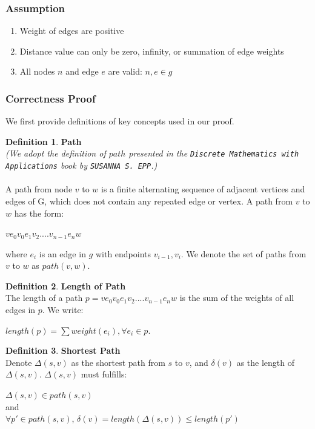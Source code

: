 \documentclass[11pt, a4paper]{article} %
\theoremstyle{definition}
\newtheorem{definition}{Definition}[section]
\begin{document}
\subsubsection{Assumption}
\begin{enumerate}
  \item Weight of edges are positive
  \item Distance value can only be zero, infinity, or summation of edge weights
  \item All nodes $n$ and edge $e$ are valid: $n, e \in g$
\end{enumerate}

\subsubsection{Correctness Proof}
We first provide definitions of key concepts used in our proof.
\theoremstyle{definition}
\begin{definition}\textbf{Path}\\
\textit{(We adopt the definition of $path$ presented in the \texttt{Discrete Mathematics with Applications} book by \texttt{SUSANNA S. EPP}.)}
\\\\
A path from node $v$ to $w$ is a finite alternating sequence of adjacent vertices and edges of G, which does not contain any repeated edge or vertex. A path from $v$ to $w$ has the form: 
\begin{center}
 $ve_0v_0e_1v_2....v_{n-1}e_nw$ 
\end{center}
where $e_i$ is an edge in $g$ with endpoints $v_{i-1}, v_i$. We denote the set of paths from $v$ to $w$ as $path(v, w)$.
\end{definition}
\begin{definition}\textbf{Length of Path} \\
The length of a path $p = ve_0v_0e_1v_2....v_{n-1}e_nw$ is the sum of the weights of all edges in $p$. We write: 
\begin{center}
  $length(p) = \sum weight(e_i), \forall e_i \in p$. 
\end{center} 
\end{definition}
\begin{definition}\textbf{Shortest Path}\\
Denote $\Delta(s, v)$ as the shortest path from $s$ to $v$, and $\delta(v)$ as the length of $\Delta(s, v)$. $\Delta(s, v)$ must fulfills: 
\begin{center}
$\Delta(s, v) \in path(s, v)$ 
\\
and 
\\
$\forall p' \in path(s, v)$, $\delta(v) = length(\Delta(s, v)) \leq length(p')$
\end{center}
\end{definition}
\end{document}
